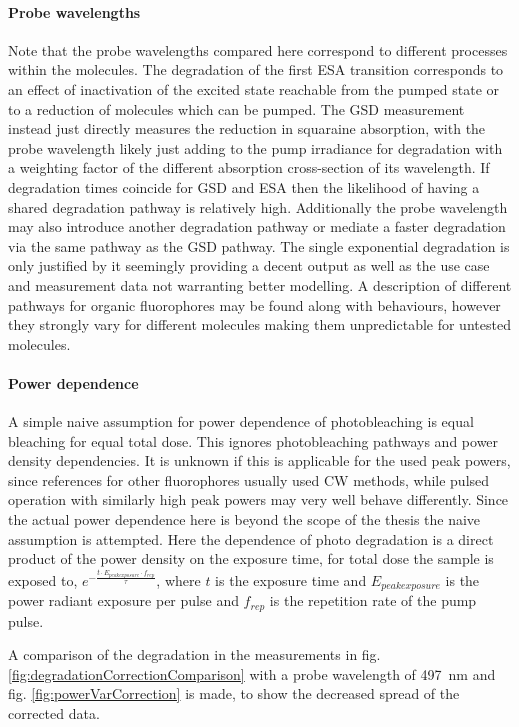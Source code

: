 \documentclass[twoside,openright]{scrreprt}
\begin{document}
{\paragraph{Probe wavelengths}
Note that the probe wavelengths compared here correspond to different processes within the molecules. The degradation of the first ESA transition corresponds to an effect of inactivation of the excited state reachable from the pumped state or to a reduction of molecules which can be pumped. The GSD measurement instead just directly measures the reduction in squaraine absorption, with the probe wavelength likely just adding to the pump irradiance for degradation with a weighting factor of the different absorption cross-section of its wavelength. If degradation times coincide for GSD and ESA then the likelihood of having a shared degradation pathway is relatively high. Additionally the probe wavelength may also introduce another degradation pathway or mediate a faster degradation via the same pathway as the GSD pathway. The single exponential degradation is only justified by it seemingly providing a decent output as well as the use case and measurement data not warranting better modelling. A description of different pathways for organic fluorophores may be found along with behaviours, however they strongly vary for different molecules making them unpredictable for untested molecules.\cite{Demchenko_2020}

\paragraph{Power dependence}
A simple naive assumption for power dependence of photobleaching is equal bleaching for equal total dose. This ignores photobleaching pathways and power density dependencies. It is unknown if this is applicable for the used peak powers, since references for other fluorophores usually used CW methods, while pulsed operation with similarly high peak powers may very well behave differently. Since the actual power dependence here is beyond the scope of the thesis the naive assumption is attempted. Here the dependence of photo degradation is a direct product of the power density on the exposure time, for total dose the sample is exposed to, $e^{-\frac{t\cdot E_{peak exposure}\cdot f_{rep}}{\tau}}$, where $t$ is the exposure time and $E_{peak exposure}$ is the power radiant exposure per pulse and $f_{rep}$ is the repetition rate of the pump pulse.\cite{Eggeling1998}

A comparison of the degradation in the measurements in fig. \ref{fig:degradationCorrectionComparison} with a probe wavelength of \SI{497}{\nano\meter} and fig. \ref{fig:powerVarCorrection} is made, to show the decreased spread of the corrected data.

}
\end{document}
